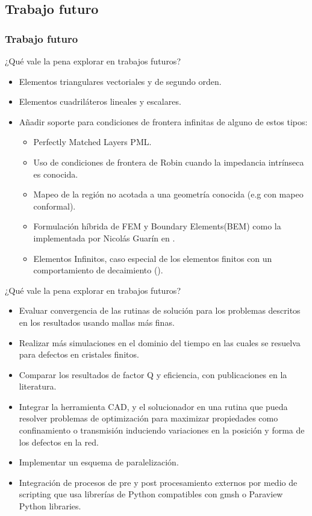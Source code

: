 \documentclass[xcolor=table,serif,handout]{beamer}
\begin{document}
	\subsection{Trabajo futuro}
	\begin{frame}
		\frametitle{Trabajo futuro}
		¿Qué vale la pena explorar en trabajos futuros?		
		\begin{itemize}
		\pause
		\item Elementos triangulares vectoriales y de segundo orden.
		\pause		
		\item  Elementos cuadriláteros lineales y escalares.
		\pause
		\item Añadir soporte para condiciones de frontera infinitas de alguno de estos tipos:
		\begin{itemize}
			\pause
			\item  Perfectly Matched Layers PML\cite{Jin2010}. 
			\pause
			\item Uso de condiciones de frontera de Robin cuando la impedancia intrínseca es conocida.
			\pause
			\item Mapeo  de la región no acotada a una geometría conocida (e.g con mapeo conformal). \pause
		\item Formulación híbrida de  FEM y Boundary Elements(BEM) como la implementada por Nicol\'as Guar\'in en \cite{Guarin2012}.
		\pause
		\item Elementos Infinitos, caso especial de los elementos finitos con un comportamiento de decaimiento (\cite{Zienkiewicz2005}).
		\end{itemize} 
	\end{itemize}
	\end{frame}
	\begin{frame}
	¿Qué vale la pena explorar en trabajos futuros?
		\begin{itemize}
		\pause
		\item Evaluar convergencia de las rutinas de solución para los problemas descritos en los resultados usando mallas más finas.
		\pause
		\item Realizar más simulaciones en el dominio del tiempo en las cuales se resuelva para defectos en cristales finitos.
		\pause
		\item Comparar los resultados de factor Q y eficiencia, con publicaciones en la literatura.
		\pause
		\item Integrar la herramienta CAD, y el solucionador en una rutina que pueda resolver problemas de optimización para maximizar propiedades como confinamiento o transmisión induciendo variaciones en la posición y forma de los defectos en la red.
		\pause
		\item Implementar un esquema de paralelización.
		\pause
		\item Integración de procesos de pre y post procesamiento externos por medio de scripting que usa librerías de Python compatibles con gmsh o Paraview Python libraries.
		\end{itemize}
	\end{frame}
\end{document}

